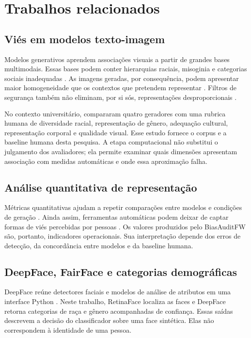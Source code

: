 \chapter{Trabalhos relacionados}
\label{cap:revisao}

\section{Viés em modelos texto-imagem}

Modelos generativos aprendem associações visuais a partir de grandes bases multimodais. Essas bases podem conter hierarquias raciais, misoginia e categorias sociais inadequadas \cite{birhane2021}. As imagens geradas, por consequência, podem apresentar maior homogeneidade que os contextos que pretendem representar \cite{bianchi2023}. Filtros de segurança também não eliminam, por si sós, representações desproporcionais \cite{schneider2025}.

No contexto universitário,  compararam quatro geradores com uma rubrica humana de diversidade racial, representação de gênero, adequação cultural, representação corporal e qualidade visual. Esse estudo fornece o corpus e a baseline humana desta pesquisa. A etapa computacional não substitui o julgamento dos avaliadores; ela permite examinar quais dimensões apresentam associação com medidas automáticas e onde essa aproximação falha.

\section{Análise quantitativa de representação}

Métricas quantitativas ajudam a repetir comparações entre modelos e condições de geração \cite{viceetal2025}. Ainda assim, ferramentas automáticas podem deixar de captar formas de viés percebidas por pessoas \cite{lyu2025}. Os valores produzidos pelo BiasAuditFW são, portanto, indicadores operacionais. Sua interpretação depende dos erros de detecção, da concordância entre modelos e da baseline humana.

\section{DeepFace, FairFace e categorias demográficas}

DeepFace reúne detectores faciais e modelos de análise de atributos em uma interface Python \cite{serengil2026boosted}. Neste trabalho, RetinaFace localiza as faces e DeepFace retorna categorias de raça e gênero acompanhadas de confiança. Essas saídas descrevem a decisão do classificador sobre uma face sintética. Elas não correspondem à identidade de uma pessoa.

